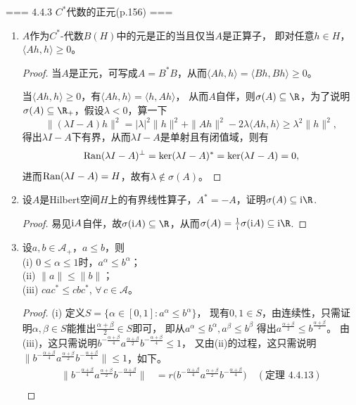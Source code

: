 === 4.4.3 $C^*$代数的正元(p.156) ===
\begin{enumerate}
\item[1] $A$作为$C^*$-代数$B(H)$中的元是正的当且仅当$A$是正算子，
即对任意$h \in H$，$\langle Ah,h \rangle\geqslant0$。
\begin{proof}
    当$A$是正元，可写成$A=B^*B$，从而$\langle Ah,h \rangle=\langle Bh,Bh \rangle\geqslant0$。

    当$\langle Ah,h \rangle\geqslant0$，有$\langle Ah,h \rangle=\langle h,Ah \rangle$，
    从而$A$自伴，则$\sigma(A)\subseteq\R$，为了说明$\sigma(A)\subseteq\R_+$，假设$\lambda<0$，算一下
    \[\|(\lambda I-A)h\|^2=|\lambda|^2\|h\|^2+\|Ah\|^2-2\lambda\langle Ah,h \rangle\geqslant\lambda^2\|h\|^2,\]
    得出$\lambda I-A$下有界，从而$\lambda I-A$是单射且有闭值域，则有
    \[\operatorname{Ran}(\lambda I-A)^\perp=\ker(\lambda I-A)^*=\ker(\lambda I-A)=0,\]
    进而$\operatorname{Ran}(\lambda I-A)=H$，故有$\lambda\notin\sigma(A)$。
\end{proof}
\item[2] 设$A$是Hilbert空间$H$上的有界线性算子，$A^*=-A$，证明$\sigma(A)\subseteq{\rm i}\R$.
\begin{proof}
    易见${\rm i}A$自伴，故$\sigma({\rm i}A)\subseteq\R$，从而$\sigma(A)=\frac{1}{{\rm i}}\sigma({\rm i}A)\subseteq{\rm i}\R$.
\end{proof}
\item[3] 设$a,b\in\mathscr{A}_+$，$a \leqslant b$，则\\
(i) $0\leqslant\alpha\leqslant1$时，$a^\alpha \leqslant b^\alpha$；\\
(ii) $\|a\|\leqslant\|b\|$；\\
(iii) $cac^* \leqslant cbc^*$, $\forall\,c\in\mathscr{A}$。
\begin{proof}
(i) 定义$S=\{\alpha\in[0,1]:a^\alpha \leqslant b^\alpha\}$，
现有$0,1\in S$，由连续性，只需证明$\alpha,\beta\in S$能推出$\frac{\alpha+\beta}{2}\in S$即可，
即从$a^\alpha \leqslant b^\alpha,a^\beta \leqslant b^\beta$
得出$a^\frac{\alpha+\beta}{2} \leqslant b^\frac{\alpha+\beta}{2}$。
由(iii)，这只需说明$b^{-\frac{\alpha+\beta}{4}}a^\frac{\alpha+\beta}{2}b^{-\frac{\alpha+\beta}{4}}\leqslant1$，
又由(ii)的过程，这只需说明$\big\|b^{-\frac{\alpha+\beta}{4}}a^\frac{\alpha+\beta}{2}b^{-\frac{\alpha+\beta}{4}}\big\|\leqslant1$，如下。
\begin{align*}
    \big\|b^{-\frac{\alpha+\beta}{4}}a^\frac{\alpha+\beta}{2}b^{-\frac{\alpha+\beta}{4}}\big\|
    &=r\big(b^{-\frac{\alpha+\beta}{4}}a^\frac{\alpha+\beta}{2}b^{-\frac{\alpha+\beta}{4}}\big) \quad (\text{定理 4.4.13})\\

\end{align*}
\end{proof}
\end{enumerate}
